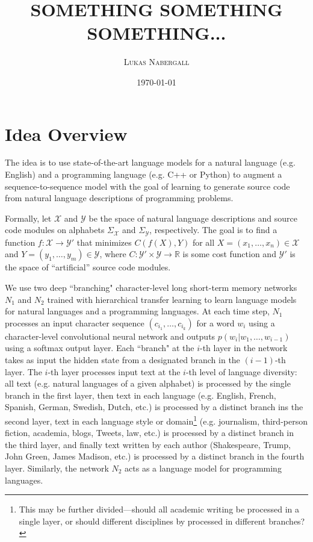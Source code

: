 \documentclass[12pt,letterpaper]{article}
\theoremstyle{remark}
\theoremstyle{plain}
\begin{document}
\title{\uppercase{\textbf{\normalsize Something something something...}}}

\author{\small{\textsc{Lukas Nabergall}}}
\date{\small{\textsc{\today}}}
\maketitle

\allowdisplaybreaks


\section{Idea Overview}

The idea is to use state-of-the-art language models for a natural language (e.g. English) and a programming language (e.g. C++ or Python) to augment a sequence-to-sequence model with the goal of learning to generate source code from natural language descriptions of programming problems. 

Formally, let $\mathcal{X}$ and $\mathcal{Y}$ be the space of natural language descriptions and source code modules on alphabets $\Sigma_{\mathcal{X}}$ and $\Sigma_{\mathcal{Y}}$, respectively. The goal is to find a function $f: \mathcal{X} \rightarrow \mathcal{Y}'$ that minimizes $C(f(X), Y)$ for all $X = (x_{1}, \ldots, x_{n}) \in \mathcal{X}$ and $Y = (y_{1}, \ldots, y_{m}) \in \mathcal{Y}$, where $C: \mathcal{Y}' \times \mathcal{Y} \rightarrow \mathbb{R}$ is some cost function and $\mathcal{Y}'$ is the space of ``artificial'' source code modules. 

We use two deep ``branching" character-level long short-term memory networks $N_{1}$ and $N_{2}$ trained with hierarchical transfer learning to learn language models for natural languages and a programming languages. At each time step, $N_{1}$ processes an input character sequence $(c_{i_{1}}, \ldots, c_{i_{k}})$ for a word $w_{i}$ using a character-level convolutional neural network and outputs $p(w_{i} | w_{1}, \ldots, w_{i-1})$ using a softmax output layer. Each ``branch" at the $i$-th layer in the network takes as input the hidden state from a designated branch in the $(i-1)$-th layer. The $i$-th layer processes input text at the $i$-th level of language diversity: all text (e.g. natural languages of a given alphabet) is processed by the single branch in the first layer, then text in each language (e.g. English, French, Spanish, German, Swedish, Dutch, etc.) is processed by a distinct branch ins the second layer, text in each language style or domain\footnote{This may be further divided---should all academic writing be processed in a single layer, or should different disciplines by processed in different branches?} (e.g. journalism, third-person fiction, academia, blogs, Tweets, law, etc.) is processed by a distinct branch in the third layer, and finally text written by each author (Shakespeare, Trump, John Green, James Madison, etc.) is processed by a distinct branch in the fourth layer. Similarly, the network $N_{2}$ acts as a language model for programming languages.
\end{document}
